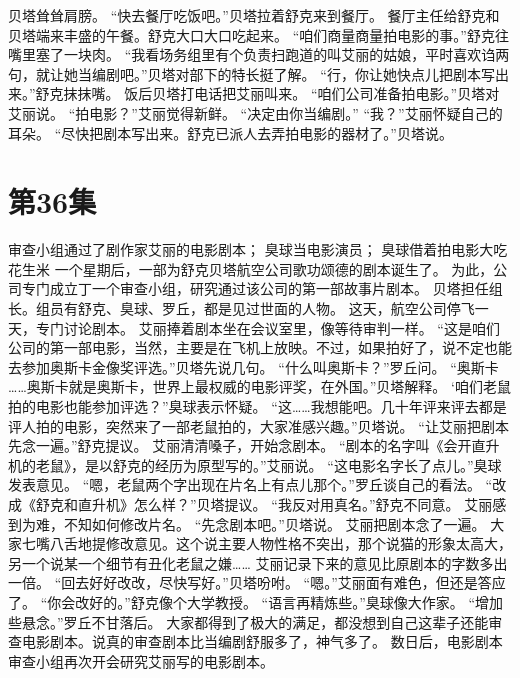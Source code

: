 \documentclass[a4paper,12pt,UTF8,twoside]{ctexbook}
\begin{document}
        贝塔耸耸肩膀。 
        “快去餐厅吃饭吧。”贝塔拉着舒克来到餐厅。 
        餐厅主任给舒克和贝塔端来丰盛的午餐。舒克大口大口吃起来。 
        “咱们商量商量拍电影的事。”舒克往嘴里塞了一块肉。 
        “我看场务组里有个负责扫跑道的叫艾丽的姑娘，平时喜欢诌两句，就让她当编剧吧。”贝塔对部下的特长挺了解。 
        “行，你让她快点儿把剧本写出来。”舒克抹抹嘴。 
        饭后贝塔打电话把艾丽叫来。 
        “咱们公司准备拍电影。”贝塔对艾丽说。 
        “拍电影？”艾丽觉得新鲜。 
        “决定由你当编剧。” 
        “我？”艾丽怀疑自己的耳朵。 
        “尽快把剧本写出来。舒克已派人去弄拍电影的器材了。”贝塔说。   \chapter{第36集} 
        审查小组通过了剧作家艾丽的电影剧本； 
        臭球当电影演员； 
        臭球借着拍电影大吃花生米   
        一个星期后，一部为舒克贝塔航空公司歌功颂德的剧本诞生了。 
        为此，公司专门成立丁一个审查小组，研究通过该公司的第一部故事片剧本。 
        贝塔担任组长。组员有舒克、臭球、罗丘，都是见过世面的人物。 
        这天，航空公司停飞一天，专门讨论剧本。 
        艾丽捧着剧本坐在会议室里，像等待审判一样。 
        “这是咱们公司的第一部电影，当然，主要是在飞机上放映。不过，如果拍好了，说不定也能去参加奥斯卡金像奖评选。”贝塔先说几句。 
        “什么叫奥斯卡？”罗丘问。 
        “奥斯卡 ……奥斯卡就是奥斯卡，世界上最权威的电影评奖，在外国。”贝塔解释。 
        ‘咱们老鼠拍的电影也能参加评选？”臭球表示怀疑。 
        “这……我想能吧。几十年评来评去都是评人拍的电影，突然来了一部老鼠拍的，大家准感兴趣。”贝塔说。 
        “让艾丽把剧本先念一遍。”舒克提议。 
        艾丽清清嗓子，开始念剧本。 
        “剧本的名字叫《会开直升机的老鼠》，是以舒克的经历为原型写的。”艾丽说。 
        “这电影名字长了点儿。”臭球发表意见。 
        “嗯，老鼠两个字出现在片名上有点儿那个。”罗丘谈自己的看法。 
        “改成《舒克和直升机》怎么样？”贝塔提议。 
        “我反对用真名。”舒克不同意。 
        艾丽感到为难，不知如何修改片名。 
        “先念剧本吧。”贝塔说。 
        艾丽把剧本念了一遍。 
        大家七嘴八舌地提修改意见。这个说主要人物性格不突出，那个说猫的形象太高大，另一个说某一个细节有丑化老鼠之嫌…… 
        艾丽记录下来的意见比原剧本的字数多出一倍。 
        “回去好好改改，尽快写好。”贝塔吩咐。 
        “嗯。”艾丽面有难色，但还是答应了。 
        “你会改好的。”舒克像个大学教授。 
        “语言再精炼些。”臭球像大作家。 
        “增加些悬念。”罗丘不甘落后。 
        大家都得到了极大的满足，都没想到自己这辈子还能审查电影剧本。说真的审查剧本比当编剧舒服多了，神气多了。 
        数日后，电影剧本审查小组再次开会研究艾丽写的电影剧本。 
\end{document}
